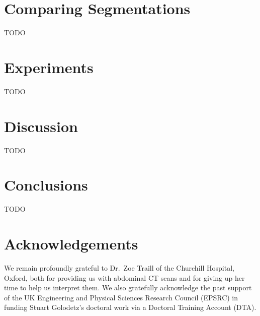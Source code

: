 \documentclass[10pt,twocolumn,twoside]{IEEEtran}
\begin{document}
\section{Comparing Segmentations}
\label{sec:comparisons}

TODO

\section{Experiments}
\label{sec:experiments}

TODO

\section{Discussion}
\label{sec:discussion}

TODO

\IEEEpubidadjcol

\section{Conclusions}
\label{sec:conclusions}

TODO

\section{Acknowledgements}

We remain profoundly grateful to Dr.\ Zoe Traill of the Churchill Hospital, Oxford, both for providing us with abdominal CT scans and for giving up her time to help us interpret them. We also gratefully acknowledge the past support of the UK Engineering and Physical Sciences Research Council (EPSRC) in funding Stuart Golodetz's doctoral work via a Doctoral Training Account (DTA).

\clearpage




\vspace{3cm}
\end{document}

